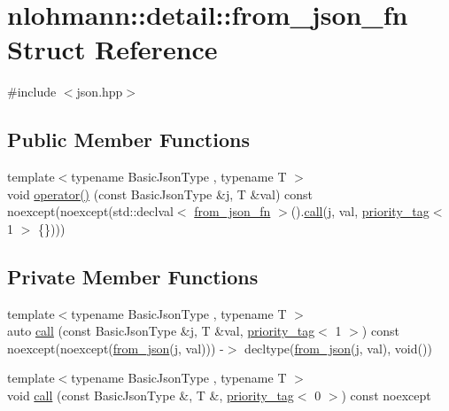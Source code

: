 \hypertarget{structnlohmann_1_1detail_1_1from__json__fn}{}\section{nlohmann\+:\+:detail\+:\+:from\+\_\+json\+\_\+fn Struct Reference}
\label{structnlohmann_1_1detail_1_1from__json__fn}


{\ttfamily \#include $<$json.\+hpp$>$}

\subsection*{Public Member Functions}
\begin{DoxyCompactItemize}
\item 
{\footnotesize template$<$typename Basic\+Json\+Type , typename T $>$ }\\void \hyperlink{structnlohmann_1_1detail_1_1from__json__fn_a48e82ad9d244fdf249caa970a253e214}{operator()} (const Basic\+Json\+Type \&j, T \&val) const noexcept(noexcept(std\+::declval$<$ \hyperlink{structnlohmann_1_1detail_1_1from__json__fn}{from\+\_\+json\+\_\+fn} $>$().\hyperlink{structnlohmann_1_1detail_1_1from__json__fn_a2d6108c9d0f54e97134203984ed8d3a3}{call}(j, val, \hyperlink{structnlohmann_1_1detail_1_1priority__tag}{priority\+\_\+tag}$<$ 1 $>$ \{\})))
\end{DoxyCompactItemize}
\subsection*{Private Member Functions}
\begin{DoxyCompactItemize}
\item 
{\footnotesize template$<$typename Basic\+Json\+Type , typename T $>$ }\\auto \hyperlink{structnlohmann_1_1detail_1_1from__json__fn_a2d6108c9d0f54e97134203984ed8d3a3}{call} (const Basic\+Json\+Type \&j, T \&val, \hyperlink{structnlohmann_1_1detail_1_1priority__tag}{priority\+\_\+tag}$<$ 1 $>$) const noexcept(noexcept(\hyperlink{namespacenlohmann_1_1detail_a58117f225f43d03e3a0a4a6f3d77c9d9}{from\+\_\+json}(j, val))) -\/$>$ decltype(\hyperlink{namespacenlohmann_1_1detail_a58117f225f43d03e3a0a4a6f3d77c9d9}{from\+\_\+json}(j, val), void())
\item 
{\footnotesize template$<$typename Basic\+Json\+Type , typename T $>$ }\\void \hyperlink{structnlohmann_1_1detail_1_1from__json__fn_a4949ab091885f0958ccff41dc5fa6725}{call} (const Basic\+Json\+Type \&, T \&, \hyperlink{structnlohmann_1_1detail_1_1priority__tag}{priority\+\_\+tag}$<$ 0 $>$) const noexcept
\end{DoxyCompactItemize}


